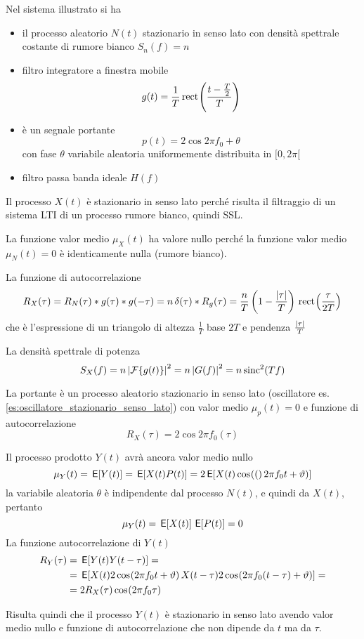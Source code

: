 Nel sistema illustrato si ha
\begin{itemize}
\item il processo aleatorio $N(t)$ stazionario in senso lato con densità spettrale costante di rumore bianco $S_n(f)=n$
\item filtro integratore a finestra mobile
\[g(t)=\frac{1}{T}\,{\operatorname{rect}}^{}\!\left({\frac{t-\frac{T}{2}}{T}}\right)\]
\item è un segnale portante
\[p(t)=2\cos{2\pi f_0+\theta}\]
con fase $\theta$ variabile aleatoria uniformemente distribuita in $[0,2\pi[$
\item filtro passa banda ideale $H(f)$
\end{itemize}

Il processo $X(t)$ è stazionario in senso lato perché risulta il filtraggio di un sistema LTI di un processo rumore bianco, quindi SSL.

La funzione valor medio $\mu_X(t)$ ha valore nullo perché la funzione valor medio $\mu_N(t)=0$ è identicamente nulla (rumore bianco).

La funzione di autocorrelazione \[R_X(\tau)=R_N(\tau)\ast g(\tau)\ast g(-\tau)=n\operatorname{\delta}(\tau)\ast R_g(\tau)= \frac{n}{T}\left(1-\frac{\left|{\tau}\right|}{T}\right)\,{\operatorname{rect}}^{}\!\left({\frac{\tau}{2T}}\right)\]
che è l'espressione di un triangolo di altezza $\frac{1}{T}$ base $2T$ e pendenza $\frac{\left|{\tau}\right|}{T}$

La densità spettrale di potenza
\[S_X(f)=n \left|{\operatorname{\mathcal{F}}\!\left\lbrace{g(t)}\right\rbrace}\right|^2=n\left|{G(f)}\right|^2=n\operatorname{sinc}^2(T f)\]

La portante è un processo aleatorio stazionario in senso lato (oscillatore es.\ref{es:oscillatore_stazionario_senso_lato}) con valor medio $\mu_p(t)=0$ e funzione di autocorrelazione
\[R_X(\tau)=2\cos{2\pi f_0(\tau)}\]

Il processo prodotto $Y(t)$ avrà ancora valor medio nullo
\[\mu_Y(t)=\,{\operatorname{\mathsf{E}}}\!\left[{Y(t)}\right]=\,{\operatorname{\mathsf{E}}}\!\left[{X(t)P(t)}\right]=2 \,{\operatorname{\mathsf{E}}}\!\left[{X(t)\,{\operatorname{cos}}^{}\!\left({(}\right)2\pi f_0 t+\vartheta)}\right]\]
la variabile aleatoria $\theta$ è indipendente dal processo $N(t)$, e quindi da $X(t)$, pertanto
\[\mu_Y(t)=\,{\operatorname{\mathsf{E}}}\!\left[{X(t)}\right]\,{\operatorname{\mathsf{E}}}\!\left[{P(t)}\right]=0\]
La funzione autocorrelazione di $Y(t)$
\[\begin{split}R_Y(\tau)&=\,{\operatorname{\mathsf{E}}}\!\left[{Y(t)Y(t-\tau)}\right]=\\&=\,{\operatorname{\mathsf{E}}}\!\left[{X(t)2\,{\operatorname{cos}}^{}\!\left({2\pi f_0 t+\vartheta}\right) X(t-\tau)2\,{\operatorname{cos}}^{}\!\left({2\pi f_0 (t-\tau)+\vartheta}\right)}\right]=\\
&=2 R_X(\tau)\,{\operatorname{cos}}^{}\!\left({2\pi f_0\tau}\right)\end{split}\]

Risulta quindi che il processo $Y(t)$ è stazionario in senso lato avendo valor medio nullo e funzione di autocorrelazione che non dipende da $t$ ma da $\tau$.

